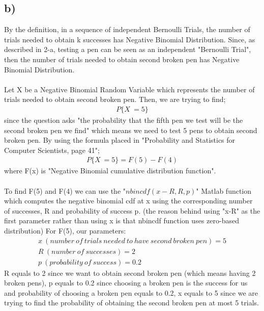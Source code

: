 \documentclass[12pt]{article}
\begin{document}
\subsection*{b)} By the definition, in a sequence of independent Bernoulli Trials, the number of trials needed to obtain k successes has Negative Binomial Distribution. Since, as described in 2-a, testing a pen can be seen as an independent "Bernoulli Trial", then the number of trials needed to obtain second broken pen has Negative Binomial Distribution. \\ \\
Let X be a Negative Binomial Random Variable which represents the number of trials needed to obtain second broken pen. Then, we are trying to find;
\begin{equation*} 
\begin{split}
P\{X\ = 5\} 
\end{split}
\end{equation*}
since the question asks "the probability that the fifth pen we test will be the second broken pen we find" which means we need to test 5 pens to obtain second broken pen. By using the formula placed in "Probability and Statistics for Computer Scientists, page 41";
\begin{equation} 
\begin{split}
P\{X\ = 5\} = F(5) - F(4)
\end{split}
\end{equation}
where F(x) is "Negative Binomial cumulative distribution function". \\ \\
To find F(5) and F(4) we can use the "$nbincdf(x-R,R,p)$" Matlab function which computes the negative binomial cdf at x using the corresponding number of successes, R and probability of success p. (the reason behind using "x-R" as the first parameter rather than using x is that nbincdf function uses zero-based distribution) For F(5), our parameters:
\begin{equation*} 
\begin{split}
x\ (number \ of\ trials\ needed\ to\ have\ second\ broken\ pen) = 5 \\
R\ (number\ of\ successes) = 2 \\
p\ (probability\ of\ success) = 0.2
\end{split}
\end{equation*}
R equals to 2 since we want to obtain second broken pen (which means having 2 broken pens), p equals to 0.2 since choosing a broken pen is the success for us and probability of choosing a broken pen equals to 0.2, x equals to 5 since we are trying to find the probability of obtaining the second broken pen at most 5 trials. \\
\end{document}
